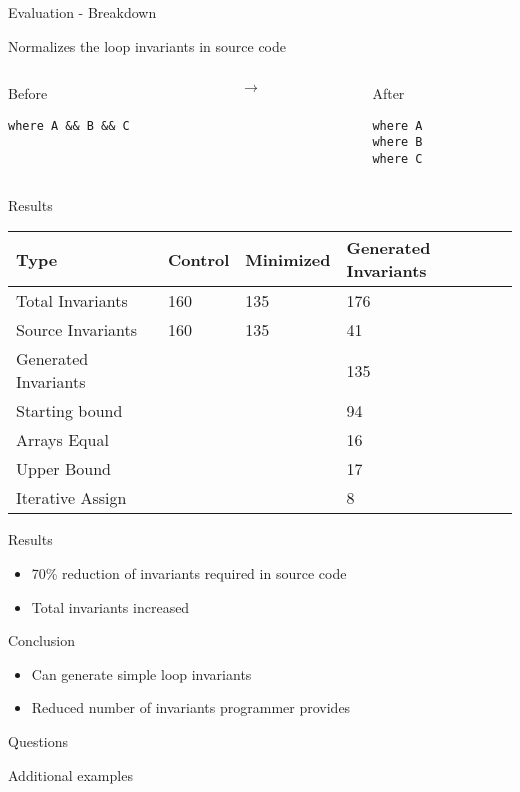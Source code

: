 \documentclass[ignorenonframetext,]{beamer}
\begin{document}
\begin{frame}[fragile]{Evaluation - Breakdown}

Normalizes the loop invariants in source code

\begin{columns}
\begin{column}{0.4\textwidth}
\begin{block}{Before}
\begin{verbatim}
where A && B && C
\end{verbatim}
\end{block}
\end{column}
\begin{column}{0.1\textwidth}
$\rightarrow$
\end{column}
\begin{column}{0.4\textwidth}
\begin{block}{After}
\begin{verbatim}
where A
where B
where C
\end{verbatim}
\end{block}
\end{column}
\end{columns}

\end{frame}

\begin{frame}{Results}

\begin{longtable}[]{@{}llll@{}}
\toprule
Type & Control & Minimized & Generated Invariants\tabularnewline
\midrule
\endhead
Total Invariants & 160 & 135 & 176\tabularnewline
Source Invariants & 160 & 135 & 41\tabularnewline
Generated Invariants & & & 135\tabularnewline
Starting bound & & & 94\tabularnewline
Arrays Equal & & & 16\tabularnewline
Upper Bound & & & 17\tabularnewline
Iterative Assign & & & 8\tabularnewline
\bottomrule
\end{longtable}

\end{frame}

\begin{frame}{Results}

\begin{itemize}
\item
  70\% reduction of invariants required in source code
\item
  Total invariants increased
\end{itemize}

\end{frame}

\begin{frame}{Conclusion}

\begin{itemize}
\item
  Can generate simple loop invariants
\item
  Reduced number of invariants programmer provides
\end{itemize}

\end{frame}

\begin{frame}

\begin{center}
    \Huge{Questions}
\end{center}

\end{frame}

\begin{frame}{Additional examples}

\end{frame}
\end{document}
